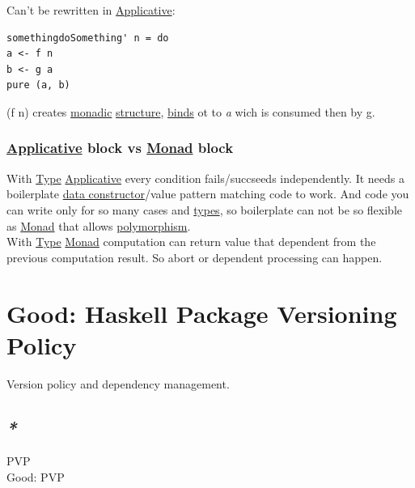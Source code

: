 \documentclass[a4paper,14pt,oneside]{book}
\begin{document}
{Can't be rewritten in \hyperref[org812e4b8]{Applicative}:\\
\begin{verbatim}
somethingdoSomething' n = do
a <- f n
b <- g a
pure (a, b)
\end{verbatim}
(f n) creates \hyperref[orgbea0cab]{monadic} \hyperref[org080800e]{structure}, \hyperref[org414b3ae]{binds} ot to \emph{a} wich is consumed then by g.\\

\subsection{\hyperref[org812e4b8]{Applicative} block vs \hyperref[org90c21ab]{Monad} block}
\label{sec:orgcc13095}

With \hyperref[orga9ca243]{Type} \hyperref[org812e4b8]{Applicative} every condition fails/succseeds independently. It needs a boilerplate \hyperref[orgd64b03a]{data constructor}/value pattern matching code to work. And code you can write only for so many cases and \hyperref[org51532d9]{types}, so boilerplate can not be so flexible as \hyperref[org90c21ab]{Monad} that allows \hyperref[org6d89c11]{polymorphism}.\\
With \hyperref[orga9ca243]{Type} \hyperref[org90c21ab]{Monad} computation can return value that dependent from the previous computation result. So abort or dependent processing can happen.\\

\chapter{\label{orgf27b4b8}Good: Haskell Package Versioning Policy}
\label{sec:org1836726}

Version policy and dependency management.\\

\begin{center}

\end{center}

\section{\emph{*}}
\label{sec:org58241fc}

\label{orgc3233c9}PVP\\
\label{org1b37689}Good: PVP\\

}
\end{document}

